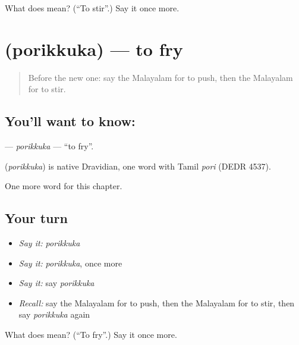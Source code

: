 \begin{tcolorbox}[breakable,colback=teal!4,colframe=teal!35!black,title={Before you move on}]
What does  mean? (\textquotedblleft{}To stir\textquotedblright{}.) Say it once more.
\end{tcolorbox}
\section[\texorpdfstring{\ml{പൊരിക്കുക} (porikkuka)}{പൊരിക്കുക (porikkuka)}]{ (porikkuka) — to fry}

\label{lesson:ML-C182-porikkuka}



\begin{quote}
Before the new one: say the Malayalam for to push, then the Malayalam for to stir.
\end{quote}

\subsection*{You'll want to know: }
\textbf{} — \emph{porikkuka} — \textquotedblleft{}to fry\textquotedblright{}.

\begin{cousinweb}
\textbf{} (\emph{porikkuka}) is native Dravidian, one word with Tamil \emph{pori} (DEDR 4537).
\end{cousinweb}

\begin{grammarlens}[title={What you've built}]
One more word for this chapter.
\end{grammarlens}

\subsection*{Your turn}
\begin{itemize}
\raggedright
  \item \emph{Say it:} \emph{porikkuka}
  \item \emph{Say it:} \emph{porikkuka}, once more
  \item \emph{Say it:} say \emph{porikkuka}
  \item \emph{Recall:} say the Malayalam for to push, then the Malayalam for to stir, then say \emph{porikkuka} again
\end{itemize}

\begin{tcolorbox}[breakable,colback=teal!4,colframe=teal!35!black,title={Before you move on}]
What does  mean? (\textquotedblleft{}To fry\textquotedblright{}.) Say it once more.
\end{tcolorbox}
